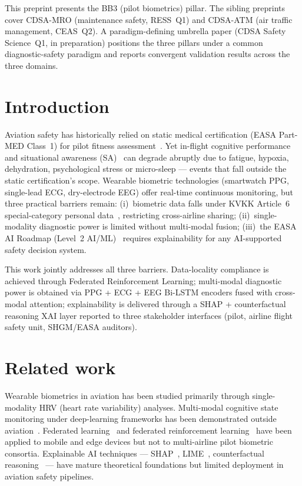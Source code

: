 \documentclass[11pt]{article}
\begin{document}
This preprint presents the BB3 (pilot biometrics) pillar. The sibling preprints cover CDSA-MRO (maintenance safety, RESS~Q1) and CDSA-ATM (air traffic management, CEAS~Q2). A paradigm-defining umbrella paper (CDSA Safety Science~Q1, in preparation) positions the three pillars under a common diagnostic-safety paradigm and reports convergent validation results across the three domains.

\section{Introduction}
Aviation safety has historically relied on static medical certification (EASA Part-MED Class~1) for pilot fitness assessment~\cite{partfcl}. Yet in-flight cognitive performance and situational awareness (SA)~\cite{endsley1995} can degrade abruptly due to fatigue, hypoxia, dehydration, psychological stress or micro-sleep --- events that fall outside the static certification's scope. Wearable biometric technologies (smartwatch PPG, single-lead ECG, dry-electrode EEG) offer real-time continuous monitoring, but three practical barriers remain: (i)~biometric data falls under KVKK Article~6 special-category personal data~\cite{kvkk}, restricting cross-airline sharing; (ii)~single-modality diagnostic power is limited without multi-modal fusion; (iii)~the EASA AI Roadmap (Level~2 AI/ML)~\cite{easaai} requires explainability for any AI-supported safety decision system.

This work jointly addresses all three barriers. Data-locality compliance is achieved through Federated Reinforcement Learning; multi-modal diagnostic power is obtained via PPG + ECG + EEG Bi-LSTM encoders fused with cross-modal attention; explainability is delivered through a SHAP + counterfactual reasoning XAI layer reported to three stakeholder interfaces (pilot, airline flight safety unit, SHGM/EASA auditors).

\section{Related work}
Wearable biometrics in aviation has been studied primarily through single-modality HRV (heart rate variability) analyses. Multi-modal cognitive state monitoring under deep-learning frameworks has been demonstrated outside aviation~\cite{dehais2020}. Federated learning~\cite{mcmahan2017} and federated reinforcement learning~\cite{nadiger2019} have been applied to mobile and edge devices but not to multi-airline pilot biometric consortia. Explainable AI techniques --- SHAP~\cite{lundberg2017}, LIME~\cite{ribeiro2016}, counterfactual reasoning~\cite{wachter2017} --- have mature theoretical foundations but limited deployment in aviation safety pipelines.
\end{document}
